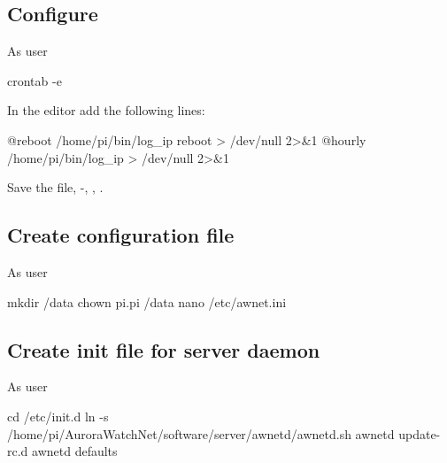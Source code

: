 \subsection{Configure \protect{}}

As user \piUser
\begin{Cmd}
crontab -e
\end{Cmd}

In the  editor add the following lines: 
\begin{Cmd}
@reboot /home/pi/bin/log_ip reboot > /dev/null 2>&1
@hourly /home/pi/bin/log_ip > /dev/null 2>&1
\end{Cmd}
Save the file, -, ,
\myreturn.

\subsection{Create configuration file}

As user \rootUser
\begin{Cmd}
mkdir /data
chown pi.pi /data
nano /etc/awnet.ini
\end{Cmd}


\subsection{Create init file for server daemon}
As user \rootUser
\begin{Cmd}
cd /etc/init.d
ln -s /home/pi/AuroraWatchNet/software/server/awnetd/awnetd.sh awnetd
update-rc.d  awnetd defaults
\end{Cmd}

